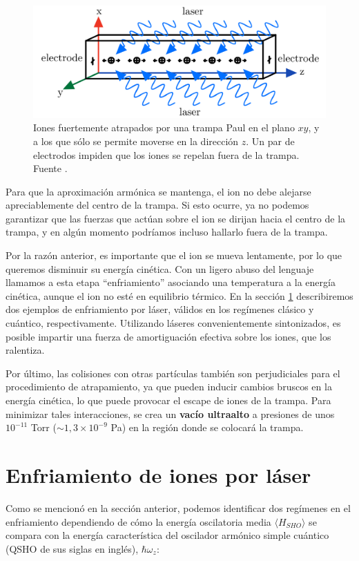 	\begin{figure}[t]
	\centering 
	\includegraphics[width=0.6\linewidth]{Figuras/Fig_ions_linear_trap.png}
	\caption{Iones fuertemente atrapados por una trampa Paul en el plano $xy$, y a los que sólo se permite moverse en la dirección $z$. Un par de electrodos impiden que los iones se repelan fuera de la trampa. Fuente \cite{bib_ions_main}.}
	\label{Fig_ions_linear_trap}
	\end{figure}

Para que la aproximación armónica se mantenga, el ion no debe alejarse apreciablemente del centro de la trampa. Si esto ocurre, ya no podemos garantizar que las fuerzas que actúan sobre el ion se dirijan hacia el centro de la trampa, y en algún momento podríamos incluso hallarlo fuera de la trampa.

Por la razón anterior, es importante que el ion se mueva lentamente, por lo que queremos disminuir su energía cinética. Con un ligero abuso del lenguaje llamamos a esta etapa ``enfriamiento'' asociando una temperatura a la energía cinética, aunque el ion no esté en equilibrio térmico. En la sección \ref{sec_ions_laser_cooling} describiremos dos ejemplos de enfriamiento por láser, válidos en los regímenes clásico y cuántico, respectivamente. Utilizando láseres convenientemente sintonizados, es posible impartir una fuerza de amortiguación efectiva sobre los iones, que los ralentiza.

Por último, las colisiones con otras partículas también son perjudiciales para el procedimiento de atrapamiento, ya que pueden inducir cambios bruscos en la energía cinética, lo que puede provocar el escape de iones de la trampa. Para minimizar tales interacciones, se crea un \textbf{vacío ultraalto} a presiones de unos $10^{-11}$ Torr ($\sim 1,3 \times 10^{-9}$ Pa) en la región donde se colocará la trampa.



\section{Enfriamiento de iones por láser} \label{sec_ions_laser_cooling}


Como se mencionó en la sección anterior, podemos identificar dos regímenes en el enfriamiento dependiendo de cómo la energía oscilatoria media $\langle H_{SHO} \rangle$ se compara con la energía característica del oscilador armónico simple cuántico (QSHO de sus siglas en inglés), $\hbar \omega_z$:

